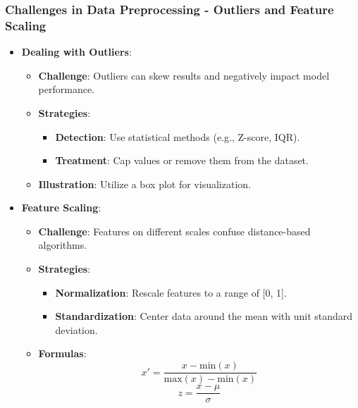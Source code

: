 \documentclass[aspectratio=169]{beamer}
\begin{document}
\begin{frame}[fragile]
    \frametitle{Challenges in Data Preprocessing - Outliers and Feature Scaling}
    \begin{itemize}
        \item \textbf{Dealing with Outliers}:
            \begin{itemize}
                \item \textbf{Challenge}: Outliers can skew results and negatively impact model performance.
                \item \textbf{Strategies}:
                    \begin{itemize}
                        \item \textbf{Detection}: Use statistical methods (e.g., Z-score, IQR).
                        \item \textbf{Treatment}: Cap values or remove them from the dataset.
                    \end{itemize}
                \item \textbf{Illustration}: Utilize a box plot for visualization.
            \end{itemize}
        
        \item \textbf{Feature Scaling}:
            \begin{itemize}
                \item \textbf{Challenge}: Features on different scales confuse distance-based algorithms.
                \item \textbf{Strategies}:
                    \begin{itemize}
                        \item \textbf{Normalization}: Rescale features to a range of [0, 1].
                        \item \textbf{Standardization}: Center data around the mean with unit standard deviation.
                    \end{itemize}
                \item \textbf{Formulas}:
                    \begin{equation}
                        x' = \frac{x - \text{min}(x)}{\text{max}(x) - \text{min}(x)}
                    \end{equation}
                    \begin{equation}
                        z = \frac{x - \mu}{\sigma}
                    \end{equation}
            \end{itemize}
    \end{itemize}
\end{frame}
\end{document}

